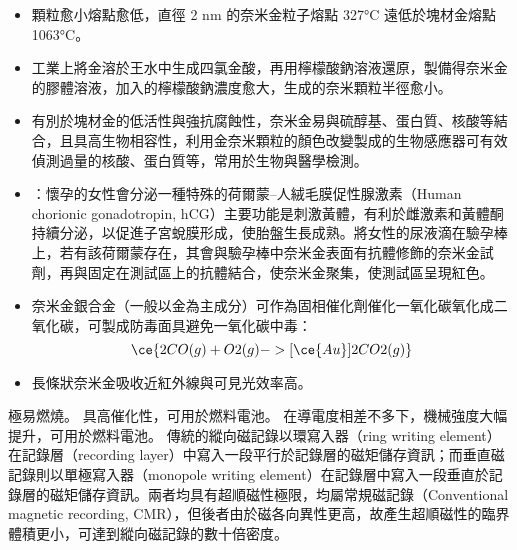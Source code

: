 \documentclass[a4paper,12pt]{report}
\begin{document}
\begin{itemize}
\begin{itemize}
\begin{itemize}
\begin{itemize}
\item 顆粒愈小熔點愈低，直徑 2 nm 的奈米金粒子熔點 327°C 遠低於塊材金熔點 1063°C。
\item 工業上將金溶於王水中生成四氯金酸，再用檸檬酸鈉溶液還原，製備得奈米金的膠體溶液，加入的檸檬酸鈉濃度愈大，生成的奈米顆粒半徑愈小。
\item 有別於塊材金的低活性與強抗腐蝕性，奈米金易與硫醇基、蛋白質、核酸等結合，且具高生物相容性，利用金奈米顆粒的顏色改變製成的生物感應器可有效偵測過量的核酸、蛋白質等，常用於生物與醫學檢測。
\item {}：懷孕的女性會分泌一種特殊的荷爾蒙–人絨毛膜促性腺激素（Human chorionic gonadotropin, hCG）主要功能是刺激黃體，有利於雌激素和黃體酮持續分泌，以促進子宮蛻膜形成，使胎盤生長成熟。將女性的尿液滴在驗孕棒上，若有該荷爾蒙存在，其會與驗孕棒中奈米金表面有抗體修飾的奈米金試劑，再與固定在測試區上的抗體結合，使奈米金聚集，使測試區呈現紅色。
\item 奈米金銀合金（一般以金為主成分）可作為固相催化劑催化一氧化碳氧化成二氧化碳，可製成防毒面具避免一氧化碳中毒：
\[\ce{2CO(g) + O2(g) -> [\ce{Au}] 2CO2(g)}\]
\item 長條狀奈米金吸收近紅外線與可見光效率高。
\end{itemize}
極易燃燒。
具高催化性，可用於燃料電池。
在導電度相差不多下，機械強度大幅提升，可用於燃料電池。
\bct\bfH\ctr{}\ef\FB\ect
傳統的縱向磁記錄以環寫入器（ring writing element）在記錄層（recording layer）中寫入一段平行於記錄層的磁矩儲存資訊；而垂直磁記錄則以單極寫入器（monopole writing element）在記錄層中寫入一段垂直於記錄層的磁矩儲存資訊。兩者均具有超順磁性極限，均屬常規磁記錄（Conventional magnetic recording, CMR），但後者由於磁各向異性更高，故產生超順磁性的臨界體積更小，可達到縱向磁記錄的數十倍密度。


\end{itemize}
\end{itemize}
\end{itemize}
\end{document}
